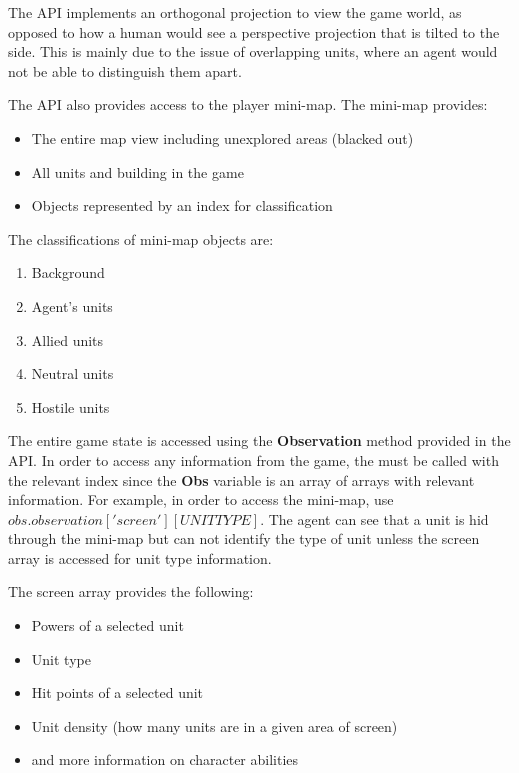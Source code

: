 The API implements an orthogonal projection to view the game world, as opposed to how a human would see a perspective projection that is tilted to the side. This is mainly due to the issue of overlapping units, where an agent would not be able to distinguish them apart.


The API also provides access to the player mini-map. The mini-map provides:

\begin{itemize}
    \item The entire map view including unexplored areas (blacked out)
    \item All units and building in the game
    \item Objects represented by an index for classification
\end{itemize}

The classifications of mini-map objects are:
\begin{enumerate}
    \item Background
    \item Agent's units
    \item Allied units
    \item Neutral units
    \item Hostile units
\end{enumerate}

The entire game state is accessed using the \textbf{Observation} method provided in the API\@.
In order to access any information from the game, the must be called with the
relevant index since the \textbf{Obs} variable is an array of arrays with
relevant information. For example, in order to access the mini-map,
use $obs.observation['screen'][UNITTYPE]$. The agent can see that a
unit is hid through the mini-map but can not identify the type of
unit unless the screen array is accessed for unit type information.

The screen array provides the following:

\begin{itemize}
    \item Powers of a selected unit
    \item Unit type
    \item Hit points of a selected unit
    \item Unit density (how many units are in a given area of screen)
    \item and more information on character abilities
\end{itemize}

